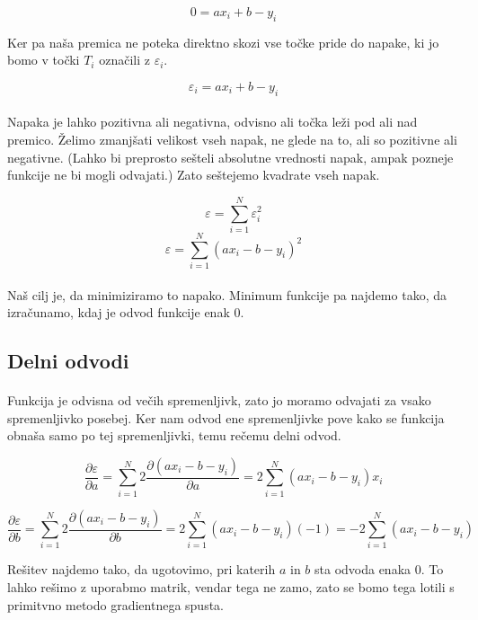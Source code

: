\documentclass[a4paper, 12pt]{article}
\begin{document}
	$$0 = a x_i + b - y_i$$

	Ker pa naša premica ne poteka direktno skozi vse točke pride do napake, ki jo bomo v točki $T_i$ označili z $\varepsilon_i$.

	$$\varepsilon_i = a x_i + b - y_i$$

	\paragraph{}
	Napaka je lahko pozitivna ali negativna, odvisno ali točka leži pod ali nad premico. Želimo zmanjšati velikost vseh napak, ne glede na to, ali so pozitivne ali negativne. (Lahko bi preprosto sešteli absolutne vrednosti napak, ampak pozneje funkcije ne bi mogli odvajati.) Zato seštejemo kvadrate vseh napak.

	$$\varepsilon = \sum_{i=1}^{N} \varepsilon_i^2$$
	$$\varepsilon = \sum_{i=1}^{N} (a x_i - b - y_i)^2$$

	\paragraph{}
	Naš cilj je, da minimiziramo to napako. Minimum funkcije pa najdemo tako, da izračunamo, kdaj je odvod funkcije enak 0.

	\subsection*{Delni odvodi}
	\paragraph{}
	Funkcija je odvisna od večih spremenljivk, zato jo moramo odvajati za vsako spremenljivko posebej. Ker nam odvod ene spremenljivke pove kako se funkcija obnaša samo po tej spremenljivki, temu rečemu delni odvod.

	$$\frac{\partial \varepsilon}{\partial a} =
		\sum_{i=1}^{N} 2 \frac{\partial (a x_i - b - y_i)}{\partial a} =
		2 \sum_{i=1}^{N} (a x_i - b - y_i)x_i$$

	$$\frac{\partial \varepsilon}{\partial b} =
		\sum_{i=1}^{N} 2 \frac{\partial (a x_i - b - y_i)}{\partial b} =
		2 \sum_{i=1}^{N} (a x_i - b - y_i)(-1) = -2 \sum_{i=1}^{N} (a x_i - b - y_i)$$

	Rešitev najdemo tako, da ugotovimo, pri katerih $a$ in $b$ sta odvoda enaka 0. To lahko rešimo z uporabmo matrik, vendar tega ne zamo, zato se bomo tega lotili s primitvno metodo gradientnega spusta.
\end{document}
